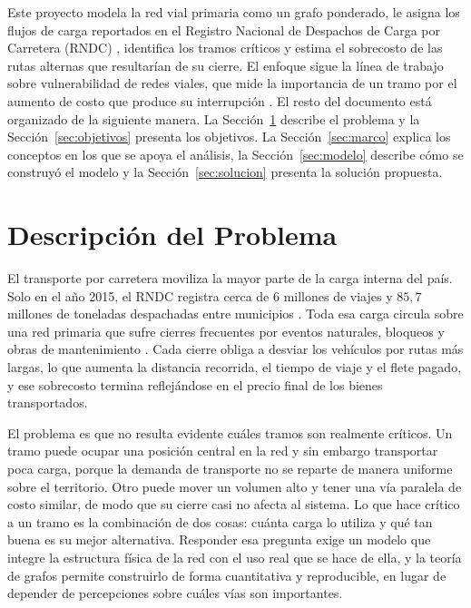 \documentclass[conference]{IEEEtran}
\begin{document}
Este proyecto modela la red vial primaria como un grafo ponderado, le asigna los
flujos de carga reportados en el Registro Nacional de Despachos de Carga por
Carretera (RNDC) \cite{rndc}, identifica los tramos críticos y estima el
sobrecosto de las rutas alternas que resultarían de su cierre. El enfoque sigue
la línea de trabajo sobre vulnerabilidad de redes viales, que mide la
importancia de un tramo por el aumento de costo que produce su interrupción
\cite{jenelius2006}. El resto del documento está organizado de la siguiente
manera. La Sección~\ref{sec:descripcion} describe el problema y la
Sección~\ref{sec:objetivos} presenta los objetivos. La
Sección~\ref{sec:marco} explica los conceptos en los que se apoya el
análisis, la Sección~\ref{sec:modelo} describe cómo se construyó el
modelo y la Sección~\ref{sec:solucion} presenta la solución propuesta.

\section{Descripción del Problema}
\label{sec:descripcion}

El transporte por carretera moviliza la mayor parte de la carga interna del
país. Solo en el año 2015, el RNDC registra cerca de $6$ millones de viajes y
$85{,}7$ millones de toneladas despachadas entre municipios \cite{rndc}. Toda
esa carga circula sobre una red primaria que sufre cierres frecuentes por
eventos naturales, bloqueos y obras de mantenimiento \cite{cambio_radiografia}.
Cada cierre obliga a desviar los vehículos por rutas más largas, lo que aumenta
la distancia recorrida, el tiempo de viaje y el flete pagado, y ese sobrecosto
termina reflejándose en el precio final de los bienes transportados.

El problema es que no resulta evidente cuáles tramos son realmente críticos. Un
tramo puede ocupar una posición central en la red y sin embargo transportar poca
carga, porque la demanda de transporte no se reparte de manera uniforme sobre el
territorio. Otro puede mover un volumen alto y tener una vía paralela de costo
similar, de modo que su cierre casi no afecta al sistema. Lo que hace crítico a
un tramo es la combinación de dos cosas: cuánta carga lo utiliza y qué tan buena
es su mejor alternativa. Responder esa pregunta exige un modelo que integre la
estructura física de la red con el uso real que se hace de ella, y la teoría de
grafos permite construirlo de forma cuantitativa y reproducible, en lugar de
depender de percepciones sobre cuáles vías son importantes.
\end{document}
